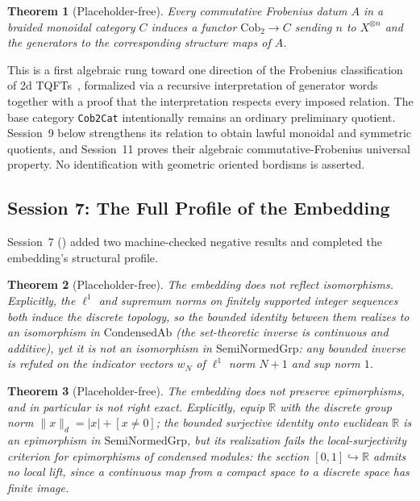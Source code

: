\documentclass[11pt]{amsart}
\theoremstyle{plain}
\newtheorem{theorem}{Theorem}[section]
\theoremstyle{definition}
\newcommand{\CondAb}{\mathrm{CondensedAb}}
\newcommand{\SemiNormedGrp}{\mathrm{SemiNormedGrp}}
\begin{document}
\begin{theorem}[Placeholder-free]
Every commutative Frobenius datum $A$ in a braided monoidal category $C$ induces a functor $\mathrm{Cob}_2 \to C$ sending $n$ to $X^{\otimes n}$ and the generators to the corresponding structure maps of $A$.
\end{theorem}

This is a first algebraic rung toward one direction of the Frobenius classification of 2d TQFTs~\cite{Kock2003}, formalized via a recursive interpretation of generator words together with a proof that the interpretation respects every imposed relation. The base category \texttt{Cob2Cat} intentionally remains an ordinary preliminary quotient. Session~9 below strengthens its relation to obtain lawful monoidal and symmetric quotients, and Session~11 proves their algebraic commutative-Frobenius universal property. No identification with geometric oriented bordisms is asserted.

\subsection{Session 7: The Full Profile of the Embedding}

Session~7 () added two machine-checked negative results and completed the embedding's structural profile.

\begin{theorem}[Placeholder-free]
The embedding does not reflect isomorphisms. Explicitly, the $\ell^1$ and supremum norms on finitely supported integer sequences both induce the discrete topology, so the bounded identity between them realizes to an isomorphism in $\CondAb$ (the set-theoretic inverse is continuous and additive), yet it is not an isomorphism in $\SemiNormedGrp$: any bounded inverse is refuted on the indicator vectors $w_N$ of $\ell^1$ norm $N+1$ and sup norm $1$.
\end{theorem}

\begin{theorem}[Placeholder-free]
The embedding does not preserve epimorphisms, and in particular is not right exact. Explicitly, equip $\mathbb{R}$ with the discrete group norm $\|x\|_d = |x| + [x \neq 0]$; the bounded surjective identity onto euclidean $\mathbb{R}$ is an epimorphism in $\SemiNormedGrp$, but its realization fails the local-surjectivity criterion for epimorphisms of condensed modules: the section $[0,1] \hookrightarrow \mathbb{R}$ admits no local lift, since a continuous map from a compact space to a discrete space has finite image.
\end{theorem}
\end{document}
